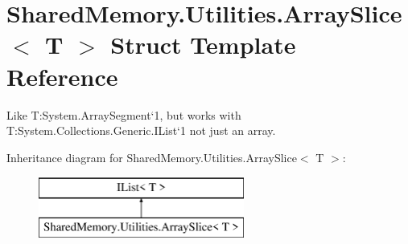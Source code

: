 \hypertarget{struct_shared_memory_1_1_utilities_1_1_array_slice}{}\section{Shared\+Memory.\+Utilities.\+Array\+Slice$<$ T $>$ Struct Template Reference}
\label{struct_shared_memory_1_1_utilities_1_1_array_slice}


Like T\+:\+System.\+Array\+Segment`1, but works with T\+:\+System.\+Collections.\+Generic.\+I\+List`1 not just an array.  


Inheritance diagram for Shared\+Memory.\+Utilities.\+Array\+Slice$<$ T $>$\+:\begin{figure}[H]
\begin{center}
\leavevmode
\includegraphics[height=2.000000cm]{struct_shared_memory_1_1_utilities_1_1_array_slice}
\end{center}
\end{figure}
